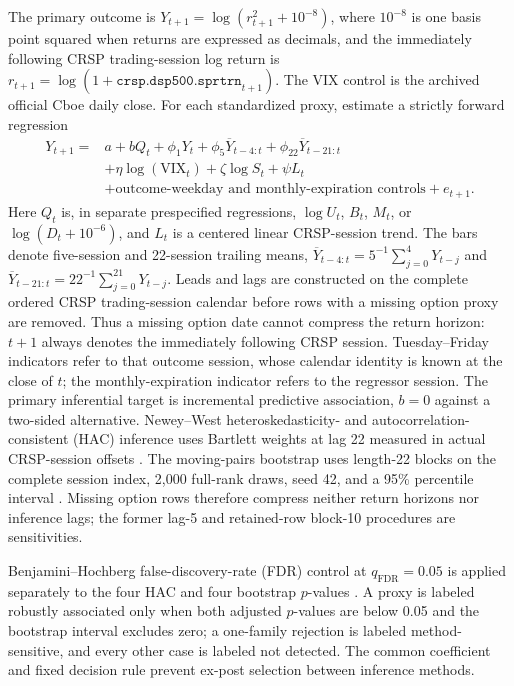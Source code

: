 \documentclass[11pt]{article}
\begin{document}
The primary outcome is $Y_{t+1}=\log(r_{t+1}^2+10^{-8})$, where $10^{-8}$ is one
basis point squared when returns are expressed as decimals, and the immediately following
CRSP trading-session log return is
$r_{t+1}=\log(1+\texttt{crsp.dsp500.sprtrn}_{t+1})$.  The VIX control is the archived
official Cboe daily close.  For each standardized proxy, estimate a strictly forward
regression
\begin{align}
Y_{t+1}={}&a+bQ_t+\phi_1Y_t+\phi_5\overline Y_{t-4:t}
+\phi_{22}\overline Y_{t-21:t}\nonumber\\
&+\eta\log(\mathrm{VIX}_t)+\zeta\log S_t+\psi L_t\nonumber\\
&+\text{outcome-weekday and monthly-expiration controls}+e_{t+1}.
\label{eq:proxy-regression}
\end{align}
Here $Q_t$ is, in separate prespecified regressions, $\log U_t$, $B_t$, $M_t$, or
$\log(D_t+10^{-6})$, and $L_t$ is a centered linear CRSP-session trend.  The bars denote
five-session and 22-session trailing means,
$\overline Y_{t-4:t}=5^{-1}\sum_{j=0}^4Y_{t-j}$ and
$\overline Y_{t-21:t}=22^{-1}\sum_{j=0}^{21}Y_{t-j}$.
Leads and lags are constructed on the complete ordered CRSP
trading-session calendar before rows with a missing option proxy are removed.  Thus a
missing option date cannot compress the return horizon: $t+1$ always denotes the immediately
following CRSP session.  Tuesday--Friday indicators refer to that outcome session, whose
calendar identity is known at the close of $t$; the monthly-expiration indicator refers to
the regressor session.  The
primary inferential target is incremental predictive association, $b=0$ against a two-sided
alternative.  Newey--West heteroskedasticity- and autocorrelation-consistent (HAC) inference
uses Bartlett weights at lag 22 measured in actual CRSP-session offsets
\citep{neweywest1987}.  The moving-pairs bootstrap uses length-22 blocks on the complete
session index, 2,000 full-rank draws, seed 42, and a 95\% percentile interval
\citep{kunsch1989}.  Missing option rows therefore compress neither return horizons nor
inference lags; the former lag-5 and retained-row block-10 procedures are sensitivities.

Benjamini--Hochberg false-discovery-rate (FDR) control at $q_{\mathrm{FDR}}=0.05$ is applied
separately to the four HAC and
four bootstrap $p$-values \citep{benjaminihochberg1995}.  A proxy is labeled robustly
associated only when both adjusted $p$-values are below 0.05 and the bootstrap interval
excludes zero; a one-family rejection is labeled method-sensitive, and every other case is
labeled not detected.  The common coefficient and fixed decision rule prevent ex-post
selection between inference methods.
\end{document}
